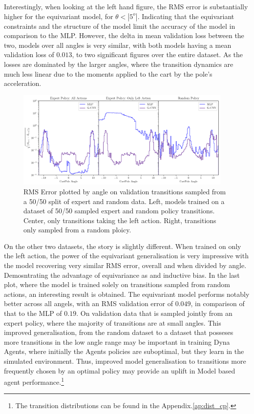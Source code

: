 Interestingly, when looking at the left hand figure, the RMS error is substantially higher for the equivariant model, for $\theta <|5^o|$. Indicating that the equivariant constraints and the structure of the model limit the accuracy of the model in comparison to the MLP. However, the delta in mean validation loss between the two, models over all angles is very similar, with both models having a mean validation loss of $0.013$, to two significant figures over the entire dataset. As the losses are dominated by the larger angles, where the transition dynamics are much less linear due to the moments applied to the cart by the pole's acceleration.
\begin{figure}[h!]
	\label{fig:cp_model_angle}
	\begin{center}
		\includegraphics[width=0.95\textwidth]{./Figures/transition_model_cp_angle.png}
	\end{center}
	\caption{RMS Error plotted by angle on validation transitions sampled from a 50/50 split of expert and random data. Left, models trained on a dataset of 50/50 sampled expert and random policy transitions. Center, only transitions taking the left action. Right, transitions only sampled from a random ploicy.}
	\label{fig:}
\end{figure}

On the other two datasets, the story is slightly different. When trained on only the left action, the power of the equivariant generalisation is very impressive with the model recovering very similar RMS error, overall and when divided by angle. Demosntrating the advantage of equivariance as and inductive bias.
In the last plot, where the model is trained solely on transitions sampled from random actions, an interesting result is obtained. The equivariant model performs notably better across all angels, with an RMS validation error of $0.049$, in comparison of that to the MLP of $0.19$. On validation data that is sampled jointly from an expert policy, where the majority of transitions are at small angles. This improved generalisation, from the random dataset to a dataset that posseses more transitions in the low angle range may be important in training Dyna Agents, where initially the Agents policies are suboptimal, but they learn in the simulated environment. Thus, improved model generalisation to transitions more frequently chosen by an optimal policy may provide an uplift in Model based agent performance.\footnote{The transition distributions can be found in the Appendix.\ref{ap:dist_cp}.}

